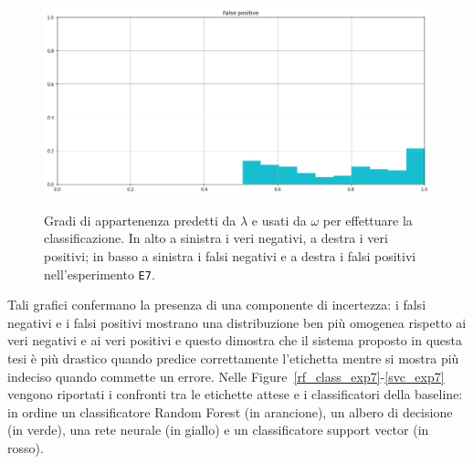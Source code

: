 \documentclass[12pt]{report}
\theoremstyle{definition}
\begin{document}
\begin{figure}
   \begin{minipage}{0.48\textwidth}
     \includegraphics[width=\linewidth]{images/experiment_kaggle/fp.png}\label{fp_k}
   \end{minipage}
   \caption{Gradi di appartenenza predetti da $\lambda$ e usati da $\omega$ per effettuare la classificazione. In alto a sinistra i veri negativi, a destra i veri positivi; in basso a sinistra i falsi negativi e a destra i falsi positivi nell'esperimento \texttt{E7}.}
   \label{4cases_exp7}
\end{figure}
Tali grafici confermano la presenza di una componente di incertezza: i falsi negativi e i falsi positivi mostrano una distribuzione ben più omogenea rispetto ai veri negativi e ai veri positivi e questo dimostra che il sistema proposto in questa tesi è più drastico quando predice correttamente l'etichetta mentre si mostra più indeciso quando commette un errore. Nelle Figure~\ref{rf_class_exp7}-\ref{svc_exp7} vengono riportati i confronti tra le etichette attese e i classificatori della baseline: in ordine un classificatore Random Forest (in arancione), un albero di decisione (in verde), una rete neurale (in giallo) e un classificatore support vector (in rosso).
\end{document}
